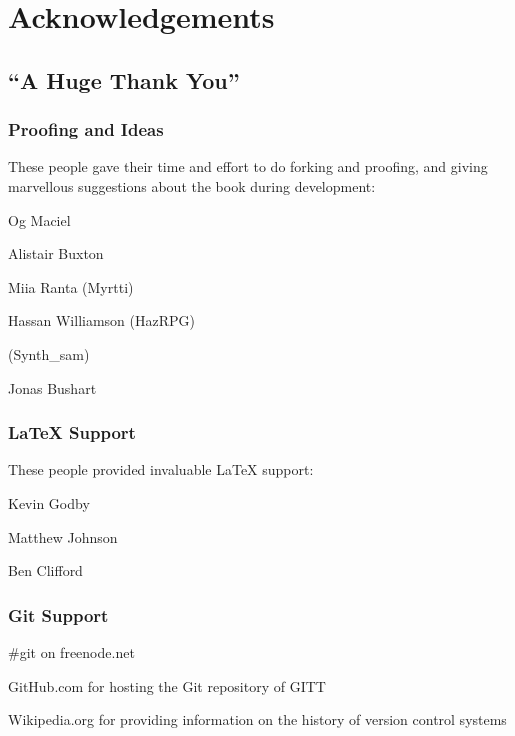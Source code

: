 \chapter{Acknowledgements}
\section{``A Huge Thank You''}

\subsection{Proofing and Ideas}
These people gave their time and effort to do forking and proofing, and giving marvellous suggestions about the book during development:

Og Maciel

Alistair Buxton

Miia Ranta (Myrtti)

Hassan Williamson (HazRPG)

(Synth\_sam)

Jonas Bushart

\subsection{\LaTeX{} Support}
These people provided invaluable \LaTeX{} support:

Kevin Godby

Matthew Johnson

Ben Clifford

\subsection{Git Support}
\#git on freenode.net

GitHub.com for hosting the Git repository of GITT

Wikipedia.org for providing information on the history of version control systems
\printindex
